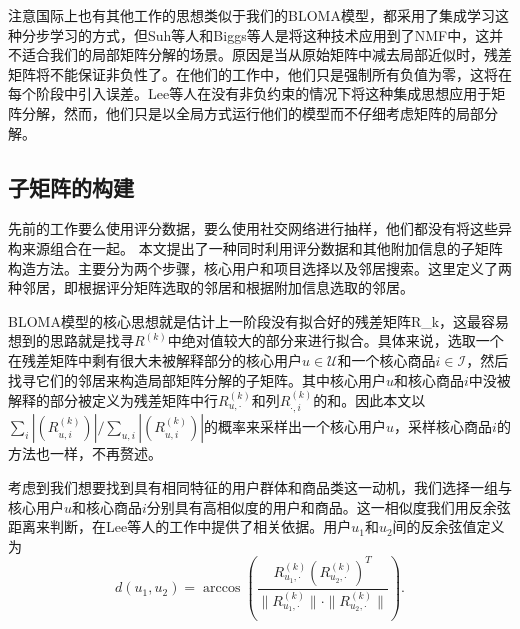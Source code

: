 注意国际上也有其他工作的思想类似于我们的BLOMA模型，都采用了集成学习这种分步学习的方式，但Suh等人和Biggs等人是将这种技术应用到了NMF中，这并不适合我们的局部矩阵分解的场景。原因是当从原始矩阵中减去局部近似时，残差矩阵将不能保证非负性了。在他们的工作中，他们只是强制所有负值为零，这将在每个阶段中引入误差。Lee等人在没有非负约束的情况下将这种集成思想应用于矩阵分解，然而，他们只是以全局方式运行他们的模型而不仔细考虑矩阵的局部分解。

\subsection{子矩阵的构建}
先前的工作要么使用评分数据，要么使用社交网络进行抽样，他们都没有将这些异构来源组合在一起。 本文提出了一种同时利用评分数据和其他附加信息的子矩阵构造方法。主要分为两个步骤，核心用户和项目选择以及邻居搜索。这里定义了两种邻居，即根据评分矩阵选取的邻居和根据附加信息选取的邻居。

BLOMA模型的核心思想就是估计上一阶段没有拟合好的残差矩阵\gls{R_k}，这最容易想到的思路就是找寻$R^{(k)}$中绝对值较大的部分来进行拟合。具体来说，选取一个在残差矩阵中剩有很大未被解释部分的核心用户$u \in \mathcal{U}$和一个核心商品$i \in \mathcal{I}$，然后找寻它们的邻居来构造局部矩阵分解的子矩阵。其中核心用户$u$和核心商品$i$中没被解释的部分被定义为残差矩阵中行$R_{u,\cdot}^{(k)}$和列$R_{\cdot,i}^{(k)}$的和。因此本文以$\sum_i|(R_{u,i}^{(k)})|/\sum_{u,i}|(R_{u,i}^{(k)})|$的概率来采样出一个核心用户$u$，采样核心商品$i$的方法也一样，不再赘述。

考虑到我们想要找到具有相同特征的用户群体和商品类这一动机，我们选择一组与核心用户$ u $和核心商品$ i $分别具有高相似度的用户和商品。这一相似度我们用反余弦距离来判断，在Lee等人的工作中提供了相关依据。用户$ u_1 $和$ u_2 $间的反余弦值定义为
\begin{equation}
\label{arc-cosine}
d(u_1,u_2) = \arccos(\frac{R_{u_1,\cdot}^{(k)} (R^{(k)}_{u_2,\cdot})^T}{\|R^{(k)}_{u_1,\cdot}\|\cdot\|R^{(k)}_{u_2,\cdot}\|}).
\end{equation}

